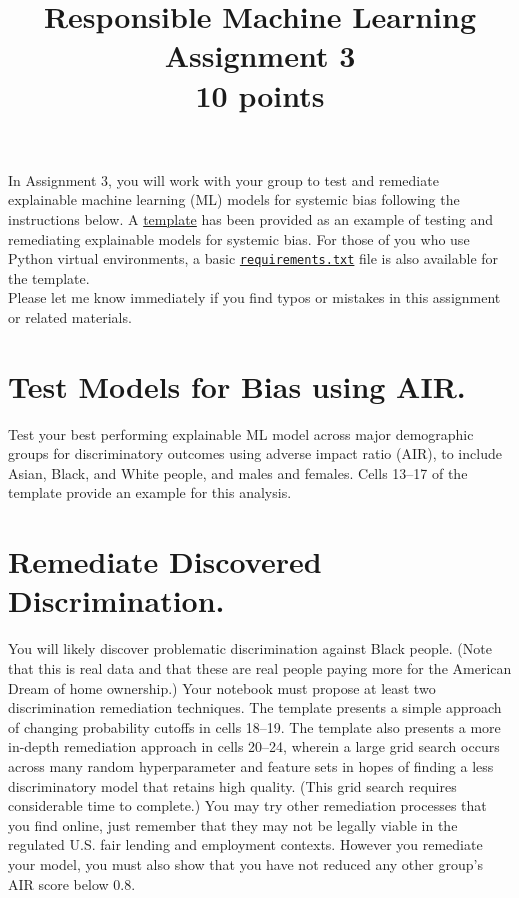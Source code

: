 \documentclass[fleqn]{article}
\title{Responsible Machine Learning\\\Large{Assignment 3}\\\Large{10 points}}
\begin{document}
\maketitle

\noindent In Assignment 3, you will work with your group to test and remediate explainable machine learning (ML) models for systemic bias following the instructions below. A \href{https://nbviewer.jupyter.org/github/jphall663/GWU_rml/blob/master/assignments/assignment_3/assign_3_template.ipynb?flush_cache=true}{template} has been provided as an example of testing and remediating explainable models for systemic bias. For those of you who use Python virtual environments, a basic \href{https://github.com/jphall663/GWU_rml/blob/master/assignments/requirements.txt}{\texttt{requirements.txt}} file is also available for the template.\\

\noindent Please let me know immediately if you find typos or mistakes in this assignment or related materials. 

\section{Test Models for Bias using AIR.}

Test your best performing explainable ML model across major demographic groups for discriminatory outcomes using adverse impact ratio (AIR), to include Asian, Black, and White people, and males and females. Cells 13--17 of the template provide an example for this analysis. 

\section{Remediate Discovered Discrimination.}

You will likely discover problematic discrimination against Black people. (Note that this is real data and that these are real people paying more for the American Dream of home ownership.) Your notebook must propose at least two discrimination remediation techniques. The template presents a simple approach of changing probability cutoffs in cells 18--19. The template also presents a more in-depth remediation approach in cells 20--24, wherein a large grid search occurs across many random hyperparameter and feature sets in hopes of finding a less discriminatory model that retains high quality. (This grid search requires considerable time to complete.) You may try other remediation processes that you find online, just remember that they may not be legally viable in the regulated U.S. fair lending and employment contexts. However you remediate your model, you must also show that you have not reduced any other group's AIR score below 0.8. 
\end{document}
